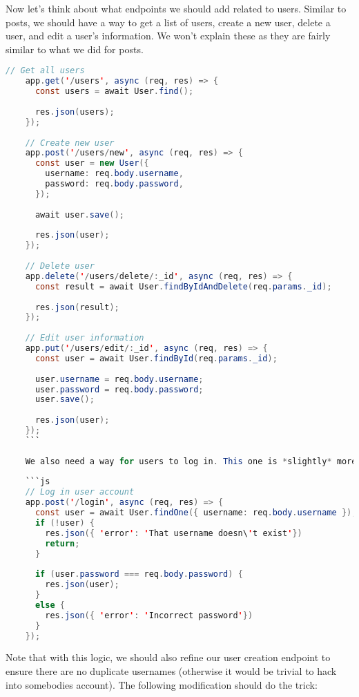 Now let's think about what endpoints we should add related to users. Similar to posts, we should have a way to get a list of users, create a new user, delete a user, and edit a user's information. We won't explain these as they are fairly similar to what we did for posts.

\begin{lstlisting}[language=Java]
    // Get all users
    app.get('/users', async (req, res) => {
      const users = await User.find();
    
      res.json(users);
    });
    
    // Create new user 
    app.post('/users/new', async (req, res) => {
      const user = new User({
        username: req.body.username,
        password: req.body.password,
      });
    
      await user.save();
    
      res.json(user);
    });
    
    // Delete user
    app.delete('/users/delete/:_id', async (req, res) => {
      const result = await User.findByIdAndDelete(req.params._id);
    
      res.json(result);
    });
    
    // Edit user information
    app.put('/users/edit/:_id', async (req, res) => {
      const user = await User.findById(req.params._id);
    
      user.username = req.body.username;
      user.password = req.body.password;
      user.save();
    
      res.json(user);
    });
    ```
    
    We also need a way for users to log in. This one is *slightly* more complicated, but not too bad yet... 
    
    ```js
    // Log in user account
    app.post('/login', async (req, res) => {
      const user = await User.findOne({ username: req.body.username });
      if (!user) {
        res.json({ 'error': 'That username doesn\'t exist'})
        return;
      }
    
      if (user.password === req.body.password) {
        res.json(user);
      }
      else {
        res.json({ 'error': 'Incorrect password'})
      }
    });
\end{lstlisting}

Note that with this logic, we should also refine our user creation endpoint to ensure there are no duplicate usernames (otherwise it would be trivial to hack into somebodies account). The following modification should do the trick:

